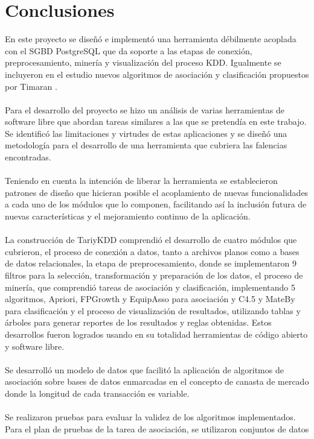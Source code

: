 \chapter{Conclusiones}
En este proyecto se dise\~n\'o e implement\'o una herramienta d\'ebilmente acoplada con el SGBD PostgreSQL que da soporte a las etapas de conexi\'on, preprocesamiento, miner\'ia y visualizaci\'on del proceso KDD.  Igualmente se incluyeron en el estudio nuevos algoritmos de asociaci\'on y clasificaci\'on propuestos por Timaran \cite{32}.\\
\\
Para el desarrollo del proyecto se hizo un an\'alisis de varias herramientas de software libre que abordan tareas similares a las que se pretend\'ia en este trabajo.  Se identific\'o las limitaciones y virtudes de estas aplicaciones y se dise\~n\'o una metodolog\'ia para el desarrollo de una herramienta que cubriera las falencias encontradas.\\
\\
Teniendo en cuenta la intenci\'on de liberar la herramienta se establecieron patrones de dise\~no que hicieran posible el acoplamiento de nuevas funcionalidades a cada uno de los m\'odulos que lo componen, facilitando as\'i la inclusi\'on futura de nuevas caracter\'isticas y el mejoramiento continuo de la aplicaci\'on.\\
\\
La construcci\'on de TariyKDD comprendi\'o el desarrollo de cuatro m\'odulos que cubrieron, el proceso de conexi\'on a datos, tanto a archivos planos como a bases de datos relacionales, la etapa de preprocesamiento, donde se implementaron 9 filtros para la selecci\'on, transformaci\'on y preparaci\'on de los datos, el proceso de miner\'ia, que comprendi\'o tareas de asociaci\'on y clasificaci\'on, implementando 5 algoritmos, Apriori, FPGrowth y EquipAsso para asociaci\'on y C4.5 y MateBy para clasificaci\'on y el proceso de visualizaci\'on de resultados, utilizando tablas y \'arboles para generar reportes de los resultados y reglas obtenidas.  Estos desarrollos fueron logrados usando en su totalidad herramientas de c\'odigo abierto y software libre.\\
\\
Se desarroll\'o un modelo de datos que facilit\'o la aplicaci\'on de algoritmos de asociaci\'on sobre bases de datos enmarcadas en el concepto de canasta de mercado donde la longitud de cada transacci\'on es variable.\\
\\
Se realizaron pruebas para evaluar la validez de los algoritmos implementados. Para el plan de pruebas de la tarea de asociaci\'on, se utilizaron conjuntos de datos
